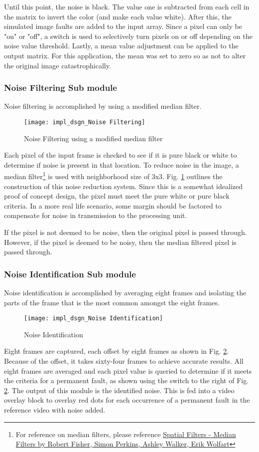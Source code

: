 \par Until this point, the noise is black. The value one is subtracted from each cell in the matrix to invert the color (and make each value white). After this, the simulated image faults are added to the input array. Since a pixel can only be "on" or "off", a switch is used to selectively turn pixels on or off depending on the noise value threshold. Lastly, a mean value adjustment can be applied to the output matrix. For this application, the mean was set to zero so as not to alter the original image catastrophically.

\subsubsection{Noise Filtering Sub module}
Noise filtering is accomplished by using a modified median filter.
\begin{figure}[H]
    \texttt{[image: impl\_dsgn\_Noise Filtering]}
    \caption{Noise Filtering using a modified median filter}
    \label{fig:medianFilter}
\end{figure}
 \par Each pixel of the input frame is checked to see if it is pure black or white to determine if noise is present in that location. To reduce noise in the image, a median filter\footnote{For reference on median filters, please reference \hyperlink{https://homepages.inf.ed.ac.uk/rbf/HIPR2/median.htm}{Spatial Filters - Median Filters by Robert Fisher, Simon Perkins, Ashley Walker, Erik Wolfart}} is used with neighborhood size of 3x3. Fig. \ref{fig:medianFilter} outlines the construction of this noise reduction system. Since this is a somewhat idealized proof of concept design, the pixel must meet the pure white or pure black criteria. In a more real life scenario, some margin should be factored to compensate for noise in transmission to the processing unit.
 \par If the pixel is not deemed to be noise, then the original pixel is passed through. However, if the pixel is deemed to be noisy,  then the median filtered pixel is passed through.
 \subsubsection{Noise Identification Sub module}
 Noise identification is accomplished by averaging eight frames and isolating the parts of the frame that is the most common amongst the eight frames.
 \begin{figure}[H]
    \texttt{[image: impl\_dsgn\_Noise Identification]}
    \caption{Noise Identification}
    \label{fig:noiseID}
\end{figure}
Eight frames are captured, each offset by eight frames as shown in Fig. \ref{fig:noiseID}. Because of the offset, it takes sixty-four frames to achieve accurate results. All eight frames are averaged and each pixel value is queried to determine if it meets the criteria for a permanent fault, as shown using the switch to the right of Fig. \ref{fig:noiseID}. The output of this module is the identified noise. This is fed into a video overlay block to overlay red dots for each occurrence of a permanent fault in the reference video with noise added.

